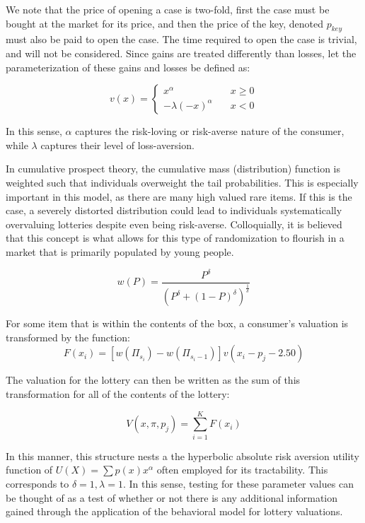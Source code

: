 \documentclass[12pt]{paper}
\newcommand{\brak}[1]{ \left [ #1 \right ] }
\begin{document}
We note that the price of opening a case is two-fold, first the case
must be bought at the market for its price, and then the price of the
key, denoted $p_{key}$ must also be paid to open the case. The time
required to open the case is trivial, and will not be
considered. Since gains are treated differently than losses, let the
parameterization of these gains and losses be defined as:

\begin{equation*}
  v(x) =
  \begin{cases}
    x^\alpha \quad &x \geq 0\\
    -\lambda(-x)^\alpha \quad &x < 0
  \end{cases}
\end{equation*}

In this sense, $\alpha$ captures the risk-loving or risk-averse nature of
the consumer, while $\lambda$ captures their level of loss-aversion.

In cumulative prospect theory, the cumulative mass (distribution)
function is weighted such that individuals overweight the tail
probabilities. This is especially important in this model, as there are
many high valued rare items. If this is the case, a severely distorted
distribution could lead to individuals systematically overvaluing
lotteries despite even being risk-averse. Colloquially, it is believed
that this concept is what allows for this type of randomization to
flourish in a market that is primarily populated by young people.

\begin{equation*}
  w(P) = \frac{ P^\delta }{( P^\delta + (1-P)^\delta )^{\frac{1}{\delta}}}
\end{equation*}

For some item that is within the contents of the box, a consumer's
valuation is transformed by the function:
\begin{equation*}
F(x_i) = \brak{w( \Pi_{s_i}) - w(\Pi_{s_i - 1}) } v( x_i - p_j - 2.50)
\end{equation*}

The valuation for the lottery can then be written as the sum of this
transformation for all of the contents of the lottery:

\begin{equation*}
  V(x,\pi,p_j) = \sum_{i=1}^K F( x_i)
\end{equation*}

In this manner, this structure nests a the hyperbolic absolute risk
aversion utility function of $U(X) = \sum p(x) x^{\alpha}$ often employed for
its tractability. This corresponds to $\delta = 1, \lambda = 1$. In this sense,
testing for these parameter values can be thought of as a test of
whether or not there is any additional information gained through the
application of the behavioral model for lottery valuations.
\end{document}
